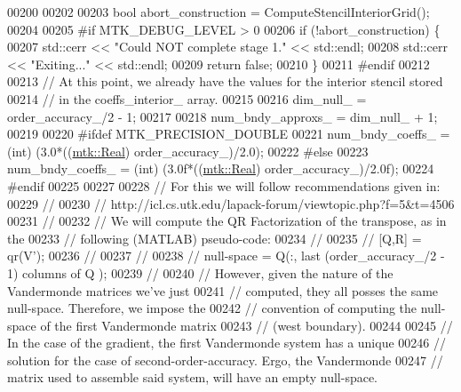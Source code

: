 \begin{DoxyCode}
00200 
00202 
00203   \textcolor{keywordtype}{bool} abort\_construction = ComputeStencilInteriorGrid();
00204 
00205 \textcolor{preprocessor}{  #if MTK\_DEBUG\_LEVEL > 0}
00206   \textcolor{keywordflow}{if} (!abort\_construction) \{
00207     std::cerr << \textcolor{stringliteral}{"Could NOT complete stage 1."} << std::endl;
00208     std::cerr << \textcolor{stringliteral}{"Exiting..."} << std::endl;
00209     \textcolor{keywordflow}{return} \textcolor{keyword}{false};
00210   \}
00211 \textcolor{preprocessor}{  #endif}
00212 
00213   \textcolor{comment}{// At this point, we already have the values for the interior stencil stored}
00214   \textcolor{comment}{// in the coeffs\_interior\_ array.}
00215 
00216   dim\_null\_ = order\_accuracy\_/2 - 1;
00217 
00218   num\_bndy\_approxs\_ = dim\_null\_ + 1;
00219 
00220 \textcolor{preprocessor}{  #ifdef MTK\_PRECISION\_DOUBLE}
00221   num\_bndy\_coeffs\_ = (int) (3.0*((\hyperlink{group__c01-roots_gac080bbbf5cbb5502c9f00405f894857d}{mtk::Real}) order\_accuracy\_)/2.0);
00222 \textcolor{preprocessor}{  #else}
00223   num\_bndy\_coeffs\_ = (int) (3.0f*((\hyperlink{group__c01-roots_gac080bbbf5cbb5502c9f00405f894857d}{mtk::Real}) order\_accuracy\_)/2.0f);
00224 \textcolor{preprocessor}{  #endif}
00225 
00227 
00228   \textcolor{comment}{// For this we will follow recommendations given in:}
00229   \textcolor{comment}{//}
00230   \textcolor{comment}{// http://icl.cs.utk.edu/lapack-forum/viewtopic.php?f=5&t=4506}
00231   \textcolor{comment}{//}
00232   \textcolor{comment}{// We will compute the QR Factorization of the transpose, as in the}
00233   \textcolor{comment}{// following (MATLAB) pseudo-code:}
00234   \textcolor{comment}{//}
00235   \textcolor{comment}{// [Q,R] = qr(V'); %
00236   \textcolor{comment}{// %
00237   \textcolor{comment}{//}
00238   \textcolor{comment}{// null-space = Q(:, last (order\_accuracy\_/2 - 1) columns of Q );}
00239   \textcolor{comment}{//}
00240   \textcolor{comment}{// However, given the nature of the Vandermonde matrices we've just}
00241   \textcolor{comment}{// computed, they all posses the same null-space. Therefore, we impose the}
00242   \textcolor{comment}{// convention of computing the null-space of the first Vandermonde matrix}
00243   \textcolor{comment}{// (west boundary).}
00244 
00245   \textcolor{comment}{// In the case of the gradient, the first Vandermonde system has a unique}
00246   \textcolor{comment}{// solution for the case of second-order-accuracy. Ergo, the Vandermonde}
00247   \textcolor{comment}{// matrix used to assemble said system, will have an empty null-space.}
}}
\end{DoxyCode}
